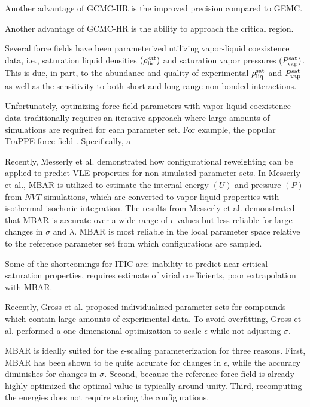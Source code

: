 \documentclass[11pt,a4paper]{article}
\begin{document}
Another advantage of GCMC-HR is the improved precision compared to GEMC.

Another advantage of GCMC-HR is the ability to approach the critical region.

Several force fields have been parameterized utilizing vapor-liquid coexistence data, i.e., saturation liquid densities $(\rho_{\rm liq}^{\rm sat})$ and saturation vapor pressures $(P_{\rm vap}^{\rm sat})$. This is due, in part, to the abundance and quality of experimental $\rho_{\rm liq}^{\rm sat}$ and $P_{\rm vap}^{\rm sat}$ as well as the sensitivity to both short and long range non-bonded interactions.

Unfortunately, optimizing force field parameters with vapor-liquid coexistence data traditionally requires an iterative approach where large amounts of simulations are required for each parameter set. For example, the popular TraPPE force field . Specifically, a 

Recently, Messerly et al. demonstrated how configurational reweighting can be applied to predict VLE properties for non-simulated parameter sets. In Messerly et al., MBAR is utilized to estimate the internal energy $(U)$ and pressure $(P)$ from $NVT$ simulations, which are converted to vapor-liquid properties with isothermal-isochoric integration. The results from Messerly et al. demonstrated that MBAR is accurate over a wide range of $\epsilon$ values but less reliable for large changes in $\sigma$ and $\lambda$. MBAR is most reliable in the local parameter space relative to the reference parameter set from which configurations are sampled.

Some of the shortcomings for ITIC are: inability to predict near-critical saturation properties, requires estimate of virial coefficients, poor extrapolation with MBAR.

Recently, Gross et al. proposed individualized parameter sets for compounds which contain large amounts of experimental data. To avoid overfitting, Gross et al. performed a one-dimensional optimization to scale $\epsilon$ while not adjusting $\sigma$. 

MBAR is ideally suited for the $\epsilon$-scaling parameterization for three reasons. First, MBAR has been shown to be quite accurate for changes in $\epsilon$, while the accuracy diminishes for changes in $\sigma$. Second, because the reference force field is already highly optimized the optimal value is typically around unity. Third, recomputing the energies does not require storing the configurations.
\end{document}
